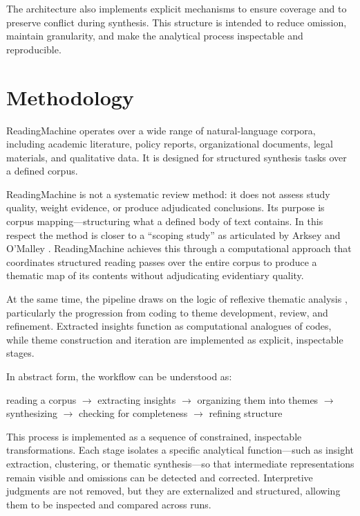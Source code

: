 \documentclass[
  11pt,
]{article}
\begin{document}
The architecture also implements explicit mechanisms to ensure coverage
and to preserve conflict during synthesis. This structure is intended to
reduce omission, maintain granularity, and make the analytical process
inspectable and reproducible.

\section{Methodology}\label{methodology}

ReadingMachine operates over a wide range of natural-language corpora,
including academic literature, policy reports, organizational documents,
legal materials, and qualitative data. It is designed for structured
synthesis tasks over a defined corpus.

ReadingMachine is not a systematic review method: it does not assess
study quality, weight evidence, or produce adjudicated conclusions. Its
purpose is corpus mapping---structuring what a defined body of text
contains. In this respect the method is closer to a ``scoping study'' as
articulated by Arksey and O'Malley \cite{arksey2005}. ReadingMachine achieves this
through a computational approach that coordinates structured reading
passes over the entire corpus to produce a thematic map of its contents
without adjudicating evidentiary quality.

At the same time, the pipeline draws on the logic of reflexive thematic
analysis \cite{braun2006}, particularly the progression from
coding to theme development, review, and refinement. Extracted insights
function as computational analogues of codes, while theme construction
and iteration are implemented as explicit, inspectable stages.

In abstract form, the workflow can be understood as:

reading a corpus $\rightarrow$ extracting insights $\rightarrow$ 
organizing them into themes $\rightarrow$ synthesizing $\rightarrow$ 
checking for completeness $\rightarrow$ refining structure

This process is implemented as a sequence of constrained, inspectable
transformations. Each stage isolates a specific analytical
function---such as insight extraction, clustering, or thematic
synthesis---so that intermediate representations remain visible and
omissions can be detected and corrected. Interpretive judgments are not
removed, but they are externalized and structured, allowing them to be
inspected and compared across runs.
\end{document}

